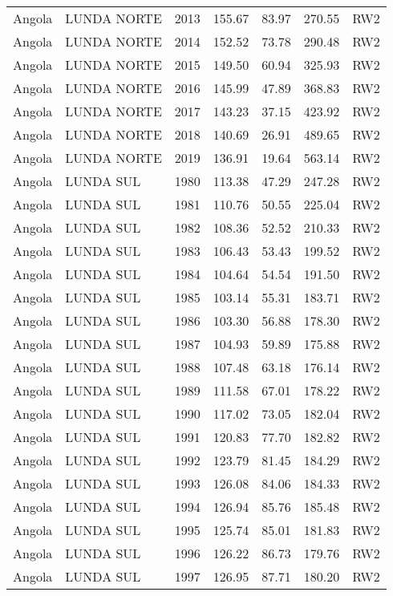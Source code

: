 \begin{longtable}{lllrrrl}
  Angola & LUNDA NORTE & 2013 & 155.67 & 83.97 & 270.55 & RW2 \\ 
  Angola & LUNDA NORTE & 2014 & 152.52 & 73.78 & 290.48 & RW2 \\ 
  Angola & LUNDA NORTE & 2015 & 149.50 & 60.94 & 325.93 & RW2 \\ 
  Angola & LUNDA NORTE & 2016 & 145.99 & 47.89 & 368.83 & RW2 \\ 
  Angola & LUNDA NORTE & 2017 & 143.23 & 37.15 & 423.92 & RW2 \\ 
  Angola & LUNDA NORTE & 2018 & 140.69 & 26.91 & 489.65 & RW2 \\ 
  Angola & LUNDA NORTE & 2019 & 136.91 & 19.64 & 563.14 & RW2 \\ 
  Angola & LUNDA SUL & 1980 & 113.38 & 47.29 & 247.28 & RW2 \\ 
  Angola & LUNDA SUL & 1981 & 110.76 & 50.55 & 225.04 & RW2 \\ 
  Angola & LUNDA SUL & 1982 & 108.36 & 52.52 & 210.33 & RW2 \\ 
  Angola & LUNDA SUL & 1983 & 106.43 & 53.43 & 199.52 & RW2 \\ 
  Angola & LUNDA SUL & 1984 & 104.64 & 54.54 & 191.50 & RW2 \\ 
  Angola & LUNDA SUL & 1985 & 103.14 & 55.31 & 183.71 & RW2 \\ 
  Angola & LUNDA SUL & 1986 & 103.30 & 56.88 & 178.30 & RW2 \\ 
  Angola & LUNDA SUL & 1987 & 104.93 & 59.89 & 175.88 & RW2 \\ 
  Angola & LUNDA SUL & 1988 & 107.48 & 63.18 & 176.14 & RW2 \\ 
  Angola & LUNDA SUL & 1989 & 111.58 & 67.01 & 178.22 & RW2 \\ 
  Angola & LUNDA SUL & 1990 & 117.02 & 73.05 & 182.04 & RW2 \\ 
  Angola & LUNDA SUL & 1991 & 120.83 & 77.70 & 182.82 & RW2 \\ 
  Angola & LUNDA SUL & 1992 & 123.79 & 81.45 & 184.29 & RW2 \\ 
  Angola & LUNDA SUL & 1993 & 126.08 & 84.06 & 184.33 & RW2 \\ 
  Angola & LUNDA SUL & 1994 & 126.94 & 85.76 & 185.48 & RW2 \\ 
  Angola & LUNDA SUL & 1995 & 125.74 & 85.01 & 181.83 & RW2 \\ 
  Angola & LUNDA SUL & 1996 & 126.22 & 86.73 & 179.76 & RW2 \\ 
  Angola & LUNDA SUL & 1997 & 126.95 & 87.71 & 180.20 & RW2 \\ 

\end{longtable}
